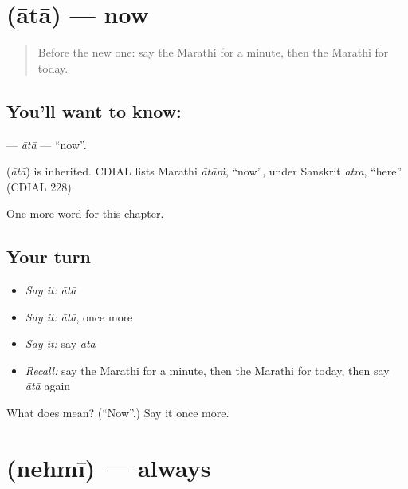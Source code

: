 \section[\texorpdfstring{\mr{आता} (ātā)}{आता (ātā)}]{ (ātā) — now}

\label{lesson:MR-C110-ata}



\begin{quote}
Before the new one: say the Marathi for a minute, then the Marathi for today.
\end{quote}

\subsection*{You'll want to know: }
\textbf{} — \emph{ātā} — \textquotedblleft{}now\textquotedblright{}.

\begin{cousinweb}
\textbf{} (\emph{ātā}) is inherited. CDIAL lists Marathi \emph{ātāṁ}, \textquotedblleft{}now\textquotedblright{}, under Sanskrit \emph{atra}, \textquotedblleft{}here\textquotedblright{} (CDIAL 228).
\end{cousinweb}

\begin{grammarlens}[title={What you've built}]
One more word for this chapter.
\end{grammarlens}

\subsection*{Your turn}
\begin{itemize}
\raggedright
  \item \emph{Say it:} \emph{ātā}
  \item \emph{Say it:} \emph{ātā}, once more
  \item \emph{Say it:} say \emph{ātā}
  \item \emph{Recall:} say the Marathi for a minute, then the Marathi for today, then say \emph{ātā} again
\end{itemize}

\begin{tcolorbox}[breakable,colback=teal!4,colframe=teal!35!black,title={Before you move on}]
What does  mean? (\textquotedblleft{}Now\textquotedblright{}.) Say it once more.
\end{tcolorbox}
\section[\texorpdfstring{\mr{नेहमी} (nehmī)}{नेहमी (nehmī)}]{ (nehmī) — always}

